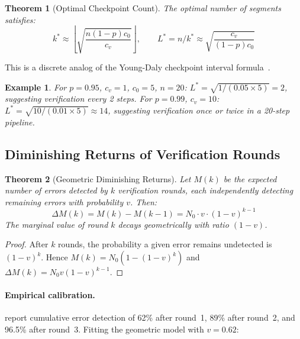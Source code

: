 \documentclass[11pt, a4paper, copyright]{googledeepmind}
\newtheorem{theorem}{Theorem}[section]
\newtheorem{example}{Example}[section]
\begin{document}
\begin{theorem}[Optimal Checkpoint Count]
\label{thm:optcheckpoints}
The optimal number of segments satisfies:
\begin{equation}
k^* \approx \left\lfloor \sqrt{\frac{n(1-p) c_0}{c_v}} \right\rfloor, \qquad
L^* = n/k^* \approx \sqrt{\frac{c_v}{(1-p) c_0}}
\end{equation}
\end{theorem}

This is a discrete analog of the Young-Daly checkpoint interval formula~\citep{young1974first, daly2006higher}.

\begin{example}
For $p = 0.95$, $c_v = 1$, $c_0 = 5$, $n = 20$: $L^* = \sqrt{1/(0.05 \times 5)} = 2$, suggesting verification every 2 steps.
For $p = 0.99$, $c_v = 10$: $L^* = \sqrt{10/(0.01 \times 5)} \approx 14$, suggesting verification once or twice in a 20-step pipeline.
\end{example}

\subsection{Diminishing Returns of Verification Rounds}

\begin{theorem}[Geometric Diminishing Returns]
\label{thm:diminishing}
Let $M(k)$ be the expected number of errors detected by $k$ verification rounds, each independently detecting remaining errors with probability $v$.
Then:
\begin{equation}
\Delta M(k) = M(k) - M(k-1) = N_0 \cdot v \cdot (1-v)^{k-1}
\end{equation}
The marginal value of round $k$ decays geometrically with ratio $(1-v)$.
\end{theorem}

\begin{proof}
After $k$ rounds, the probability a given error remains undetected is $(1-v)^k$.
Hence $M(k) = N_0(1 - (1-v)^k)$ and $\Delta M(k) = N_0 v (1-v)^{k-1}$.
\end{proof}

\paragraph{Empirical calibration.}
\citet{hariharan2025plan} report cumulative error detection of 62\% after round~1, 89\% after round~2, and 96.5\% after round~3.
Fitting the geometric model with $v = 0.62$:
\end{document}
